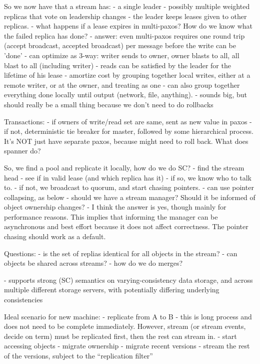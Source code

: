 So we now have that a stream has:
- a single leader
- possibly multiple weighted replicas that vote on leadership changes
- the leader keeps leases given to other replicas.
  - what happens if a lease expires in multi-paxos? How do we know
    what the failed replica has done?
  - answer: even multi-paxos requires one round trip (accept
    broadcast, accepted broadcast) per message before the write can be
    'done' 
    - can optimize as 3-way: writer sends to owner, owner blasts to
      all, all blast to all (including writer)
  - reads can be satisfied by the leader for the lifetime of his lease
  - amortize cost by grouping together local writes, either at a
    remote writer, or at the owner, and treating as one
  - can also group together everything done locally until output
    (network, file, anything).
    - sounds big, but should really be a small thing because we don't
      need to do rollbacks

Transactions:
- if owners of write/read set are same, sent as new value in paxos
- if not, deterministic tie breaker for master, followed by some
  hierarchical process. It's NOT just have separate paxos, because
  might need to roll back. What does spanner do?

So, we find a pool and replicate it locally, how do we do SC?
- find the stream head
- see if in valid lease (and which replica has it)
  - if so, we know who to talk to.
  - if not, we broadcast to quorum, and start chasing pointers.
    - can use pointer collapsing, as below
  - should we have a stream manager? Should it be informed of object
    ownership changes?  
    - I think the answer is yes, though mainly for performance
      reasons.  This implies that informing the manager can be
      asynchronous and best effort because it does not affect
      correctness.  The pointer chasing should work as a default.

Questions:
- is the set of replias identical for all objects in the stream?
- can objects be shared across streams?
- how do we do merges?

- supports strong (SC) semantics on varying-consistency data storage, and across
  multiple different storage servers, with potentially differing
  underlying consistencies

Ideal scenario for new machine:
- replicate from A to B
  - this is long process and does not need to be complete
    immediately. However, stream (or stream events, decide on term)
    must be replicated first, then the rest can stream in.
- start accessing objects
  - migrate ownership
  - migrate recent versions
- stream the rest of the versions, subject to the ``replication filter''

